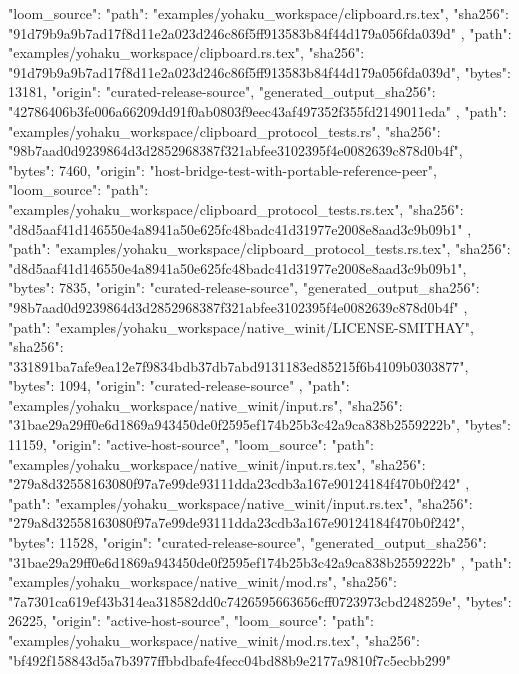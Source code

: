 {{      "loom_source": {
        "path": "examples/yohaku_workspace/clipboard.rs.tex",
        "sha256": "91d79b9a9b7ad17f8d11e2a023d246c86f5ff913583b84f44d179a056fda039d"
      }
    },
    {
      "path": "examples/yohaku_workspace/clipboard.rs.tex",
      "sha256": "91d79b9a9b7ad17f8d11e2a023d246c86f5ff913583b84f44d179a056fda039d",
      "bytes": 13181,
      "origin": "curated-release-source",
      "generated_output_sha256": "42786406b3fe006a66209dd91f0ab0803f9eec43af497352f355fd2149011eda"
    },
    {
      "path": "examples/yohaku_workspace/clipboard_protocol_tests.rs",
      "sha256": "98b7aad0d9239864d3d2852968387f321abfee3102395f4e0082639c878d0b4f",
      "bytes": 7460,
      "origin": "host-bridge-test-with-portable-reference-peer",
      "loom_source": {
        "path": "examples/yohaku_workspace/clipboard_protocol_tests.rs.tex",
        "sha256": "d8d5aaf41d146550e4a8941a50e625fc48badc41d31977e2008e8aad3c9b09b1"
      }
    },
    {
      "path": "examples/yohaku_workspace/clipboard_protocol_tests.rs.tex",
      "sha256": "d8d5aaf41d146550e4a8941a50e625fc48badc41d31977e2008e8aad3c9b09b1",
      "bytes": 7835,
      "origin": "curated-release-source",
      "generated_output_sha256": "98b7aad0d9239864d3d2852968387f321abfee3102395f4e0082639c878d0b4f"
    },
    {
      "path": "examples/yohaku_workspace/native_winit/LICENSE-SMITHAY",
      "sha256": "331891ba7afe9ea12e7f9834bdb37db7abd9131183ed85215f6b4109b0303877",
      "bytes": 1094,
      "origin": "curated-release-source"
    },
    {
      "path": "examples/yohaku_workspace/native_winit/input.rs",
      "sha256": "31bae29a29ff0e6d1869a943450de0f2595ef174b25b3c42a9ca838b2559222b",
      "bytes": 11159,
      "origin": "active-host-source",
      "loom_source": {
        "path": "examples/yohaku_workspace/native_winit/input.rs.tex",
        "sha256": "279a8d32558163080f97a7e99de93111dda23cdb3a167e90124184f470b0f242"
      }
    },
    {
      "path": "examples/yohaku_workspace/native_winit/input.rs.tex",
      "sha256": "279a8d32558163080f97a7e99de93111dda23cdb3a167e90124184f470b0f242",
      "bytes": 11528,
      "origin": "curated-release-source",
      "generated_output_sha256": "31bae29a29ff0e6d1869a943450de0f2595ef174b25b3c42a9ca838b2559222b"
    },
    {
      "path": "examples/yohaku_workspace/native_winit/mod.rs",
      "sha256": "7a7301ca619ef43b314ea318582dd0c7426595663656cff0723973cbd248259e",
      "bytes": 26225,
      "origin": "active-host-source",
      "loom_source": {
        "path": "examples/yohaku_workspace/native_winit/mod.rs.tex",
        "sha256": "bf492f158843d5a7b3977ffbbdbafe4fecc04bd88b9e2177a9810f7c5ecbb299"
}}}
